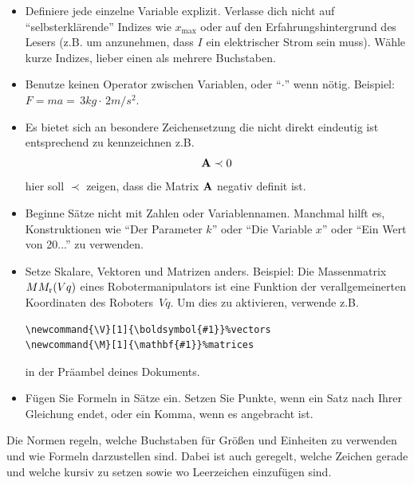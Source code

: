 \begin{itemize}
\item Definiere jede einzelne Variable explizit. Verlasse dich nicht auf ``selbsterklärende'' Indizes wie $x_{\mathrm{max}}$ oder auf den Erfahrungshintergrund des Lesers (z.B. um anzunehmen, dass $I$ ein elektrischer Strom sein muss). Wähle kurze Indizes, lieber einen als mehrere Buchstaben. 
	\item Benutze keinen Operator zwischen Variablen, oder ``$\cdot$'' wenn nötig. Beispiel: $F=ma=\,{3}{kg}\cdot\,{2}{m/s^2}$.

\item Es bietet sich an besondere Zeichensetzung die nicht direkt eindeutig ist entsprechend zu kennzeichnen z.B.
\begin{equation}
    \boldsymbol{\mathrm{A}} \prec 0
\end{equation}
hier soll $\prec$ zeigen, dass die Matrix $\boldsymbol{\mathrm{A}}$ negativ definit ist. 

\item Beginne Sätze nicht mit Zahlen oder Variablennamen. Manchmal hilft es, Konstruktionen wie ``Der Parameter $k$'' oder ``Die Variable $x$'' oder ``Ein Wert von 20...'' zu verwenden.

\item Setze Skalare, Vektoren und Matrizen anders. Beispiel:
Die Massenmatrix $M M_{\textnormal{r}}(V{q})$ eines Robotermanipulators ist eine Funktion der verallgemeinerten Koordinaten des Roboters~$V{q}$. Um dies zu aktivieren, verwende z.B.
\begin{verbatim}
\newcommand{\V}[1]{\boldsymbol{#1}}%vectors
\newcommand{\M}[1]{\mathbf{#1}}%matrices
\end{verbatim}
 in der Präambel deines Dokuments.

\item Fügen Sie Formeln in Sätze ein. Setzen Sie Punkte, wenn ein Satz nach Ihrer Gleichung endet, oder ein Komma, wenn es angebracht ist. 

\end{itemize}

Die Normen \cite{ISOnormunits}\cite{DINGroessen}\cite{DINFormelsatz}\cite{DINGroessen} 
regeln, welche Buchstaben für Größen und Einheiten zu verwenden und wie Formeln darzustellen sind. Dabei ist auch geregelt, welche Zeichen gerade und welche kursiv zu setzen sowie wo Leerzeichen einzufügen
sind.

